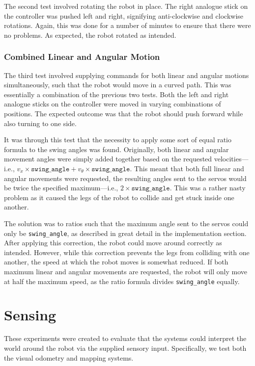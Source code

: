The second test involved rotating the robot in place. The right analogue stick on the controller was pushed left and right, signifying anti-clockwise and clockwise rotations. Again, this was done for a number of minutes to ensure that there were no problems. As expected, the robot rotated as intended.

\subsubsection{Combined Linear and Angular Motion}

The third test involved supplying commands for both linear and angular motions simultaneously, such that the robot would move in a curved path. This was essentially a combination of the previous two tests. Both the left and right analogue sticks on the controller were moved in varying combinations of positions. The expected outcome was that the robot should push forward while also turning to one side.

It was through this test that the necessity to apply some sort of equal ratio formula to the swing angles was found. Originally, both linear and angular movement angles were simply added together based on the requested velocities---i.e., $v_x \times \texttt{swing\_angle} + v_\theta \times \texttt{swing\_angle}$. This meant that both full linear and angular movements were requested, the resulting angles sent to the servos would be twice the specified maximum---i.e., $2 \times \texttt{swing\_angle}$. This was a rather nasty problem as it caused the legs of the robot to collide and get stuck inside one another.

The solution was to ratios such that the maximum angle sent to the servos could only be \texttt{swing\_angle}, as described in great detail in the implementation section. After applying this correction, the robot could move around correctly as intended. However, while this correction prevents the legs from colliding with one another, the speed at which the robot moves is somewhat reduced. If both maximum linear and angular movements are requested, the robot will only move at half the maximum speed, as the ratio formula divides \texttt{swing\_angle} equally.

\section{Sensing}

These experiments were created to evaluate that the systems could interpret the world around the robot via the supplied sensory input. Specifically, we test both the visual odometry and mapping systems.

